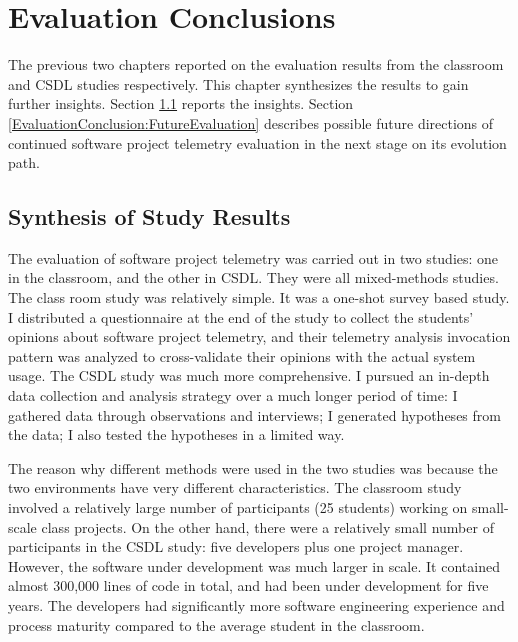 \chapter{Evaluation Conclusions}  \label{Chapter:EvaluationConclusion}

The previous two chapters reported on the evaluation results from the classroom and CSDL studies respectively. This chapter synthesizes the results to gain further insights.
Section \ref{EvaluationConclusion:Results} reports the insights.
Section \ref{EvaluationConclusion:FutureEvaluation} describes possible future directions of continued software project telemetry evaluation in the next stage on its evolution path.


\section{Synthesis of Study Results} \label{EvaluationConclusion:Results}

The evaluation of software project telemetry was carried out in two studies: one in the classroom, and the other in CSDL. They were all mixed-methods studies.
The class room study was relatively simple. It was a one-shot survey based study. I distributed a questionnaire at the end of the study to collect the students' opinions about software project telemetry, and their telemetry analysis invocation pattern was analyzed to cross-validate their opinions with the actual system usage.
The CSDL study was much more comprehensive. I pursued an in-depth data collection and analysis strategy over a much longer period of time: I gathered data through observations and interviews; I generated hypotheses from the data; I also tested the hypotheses in a limited way.

The reason why different methods were used in the two studies was because the two environments have very different characteristics. The classroom study involved a relatively large number of participants (25 students) working on small-scale class projects. On the other hand, there were a relatively small number of participants in the CSDL study: five developers plus one project manager. However, the software under development was much larger in scale. It contained almost 300,000 lines of code in total, and had been under development for five years. The developers had significantly more software engineering experience and process maturity compared to the average student in the classroom.

